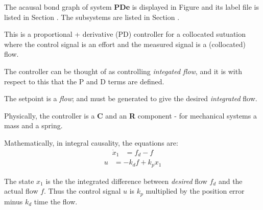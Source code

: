 

   The acausal bond graph of system \textbf{PDe} is
   displayed in Figure  and its label
   file is listed in Section .
   The subsystems are listed in Section .

   This is a proportional + derivative (PD) controller for a
   collocated sutuation where the control signal is an effort and the
   measured signal is a (collocated) flow.

   The controller can be thought of as controlling \emph{integated
   flow}, and it is with respect to this that the P and D terms are defined.

 The setpoint is a \emph{flow}; and must be generated to give the
 desired \emph{integrated} flow.

 Physically, the controller is a \textbf{C} and an \textbf{R}
 component - for mechanical systems a mass and a spring.
 
 Mathematically, in integral causality, the equations are:
 \begin{equation}
   \begin{aligned}
     \dot x_{1} &=
     {
       f_d - f
       }
   \end{aligned}
 \end{equation}
 \begin{equation}
   \begin{aligned}
     u &=
     {
       - k_{d} f + k_{p} x_{1}
       }
   \end{aligned}
 \end{equation}

 The state $x_1$ is the the integrated difference between 
 \emph{desired} flow $f_d$ and the actual flow  $f$. Thus the control
 signal $u$ is $k_p$ multiplied by the position error minus $k_d$ time
 the flow.